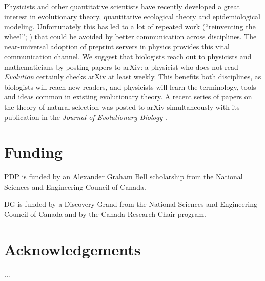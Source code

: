 \documentclass[letterpaper,twocolumn,superscriptaddress,showkeys]{revtex4}
\begin{document}
Physicists and other quantitative scientists have recently developed a great
interest in evolutionary theory, quantitative ecological theory and
epidemiological modeling.  Unfortunately this has led to a lot of repeated work
(``reinventing the wheel''; \cite{de2011contribution}) that could be avoided by
better communication across disciplines.  The near-universal adoption of
preprint servers in physics provides this vital communication channel.  We
suggest that biologists reach out to physicists and mathematicians by posting
papers to arXiv: a physicist who does not read \emph{Evolution} certainly checks
arXiv at least weekly.  This benefits both disciplines, as biologists will reach
new readers, and physicists will learn the terminology, tools and ideas common
in existing evolutionary theory.  A recent series of papers on the theory of
natural selection was posted to arXiv simultaneously with its publication in the
\emph{Journal of Evolutionary Biology}
\cite{JEB:JEB2431,JEB:JEB2498,JEB:JEB2378,JEB:JEB2373}.

\section{Funding}

PDP is funded by an Alexander Graham Bell scholarship from the National Sciences
and Engineering Council of Canada.

DG is funded by a Discovery Grand from the National Sciences and Engineering
Council of Canada and by the Canada Research Chair program.

\section{Acknowledgements}

...

\newpage


\end{document}
